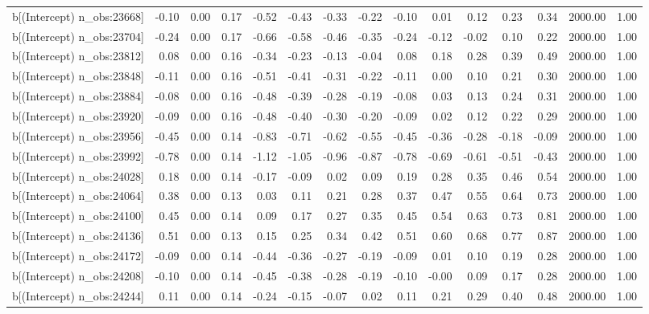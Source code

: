 \begin{table}[ht]
\begin{tabular}{rrrrrrrrrrrrrrr}
  b[(Intercept) n\_obs:23668] & -0.10 & 0.00 & 0.17 & -0.52 & -0.43 & -0.33 & -0.22 & -0.10 & 0.01 & 0.12 & 0.23 & 0.34 & 2000.00 & 1.00 \\ 
  b[(Intercept) n\_obs:23704] & -0.24 & 0.00 & 0.17 & -0.66 & -0.58 & -0.46 & -0.35 & -0.24 & -0.12 & -0.02 & 0.10 & 0.22 & 2000.00 & 1.00 \\ 
  b[(Intercept) n\_obs:23812] & 0.08 & 0.00 & 0.16 & -0.34 & -0.23 & -0.13 & -0.04 & 0.08 & 0.18 & 0.28 & 0.39 & 0.49 & 2000.00 & 1.00 \\ 
  b[(Intercept) n\_obs:23848] & -0.11 & 0.00 & 0.16 & -0.51 & -0.41 & -0.31 & -0.22 & -0.11 & 0.00 & 0.10 & 0.21 & 0.30 & 2000.00 & 1.00 \\ 
  b[(Intercept) n\_obs:23884] & -0.08 & 0.00 & 0.16 & -0.48 & -0.39 & -0.28 & -0.19 & -0.08 & 0.03 & 0.13 & 0.24 & 0.31 & 2000.00 & 1.00 \\ 
  b[(Intercept) n\_obs:23920] & -0.09 & 0.00 & 0.16 & -0.48 & -0.40 & -0.30 & -0.20 & -0.09 & 0.02 & 0.12 & 0.22 & 0.29 & 2000.00 & 1.00 \\ 
  b[(Intercept) n\_obs:23956] & -0.45 & 0.00 & 0.14 & -0.83 & -0.71 & -0.62 & -0.55 & -0.45 & -0.36 & -0.28 & -0.18 & -0.09 & 2000.00 & 1.00 \\ 
  b[(Intercept) n\_obs:23992] & -0.78 & 0.00 & 0.14 & -1.12 & -1.05 & -0.96 & -0.87 & -0.78 & -0.69 & -0.61 & -0.51 & -0.43 & 2000.00 & 1.00 \\ 
  b[(Intercept) n\_obs:24028] & 0.18 & 0.00 & 0.14 & -0.17 & -0.09 & 0.02 & 0.09 & 0.19 & 0.28 & 0.35 & 0.46 & 0.54 & 2000.00 & 1.00 \\ 
  b[(Intercept) n\_obs:24064] & 0.38 & 0.00 & 0.13 & 0.03 & 0.11 & 0.21 & 0.28 & 0.37 & 0.47 & 0.55 & 0.64 & 0.73 & 2000.00 & 1.00 \\ 
  b[(Intercept) n\_obs:24100] & 0.45 & 0.00 & 0.14 & 0.09 & 0.17 & 0.27 & 0.35 & 0.45 & 0.54 & 0.63 & 0.73 & 0.81 & 2000.00 & 1.00 \\ 
  b[(Intercept) n\_obs:24136] & 0.51 & 0.00 & 0.13 & 0.15 & 0.25 & 0.34 & 0.42 & 0.51 & 0.60 & 0.68 & 0.77 & 0.87 & 2000.00 & 1.00 \\ 
  b[(Intercept) n\_obs:24172] & -0.09 & 0.00 & 0.14 & -0.44 & -0.36 & -0.27 & -0.19 & -0.09 & 0.01 & 0.10 & 0.19 & 0.28 & 2000.00 & 1.00 \\ 
  b[(Intercept) n\_obs:24208] & -0.10 & 0.00 & 0.14 & -0.45 & -0.38 & -0.28 & -0.19 & -0.10 & -0.00 & 0.09 & 0.17 & 0.28 & 2000.00 & 1.00 \\ 
  b[(Intercept) n\_obs:24244] & 0.11 & 0.00 & 0.14 & -0.24 & -0.15 & -0.07 & 0.02 & 0.11 & 0.21 & 0.29 & 0.40 & 0.48 & 2000.00 & 1.00 \\ 

\end{tabular}
\end{table}
